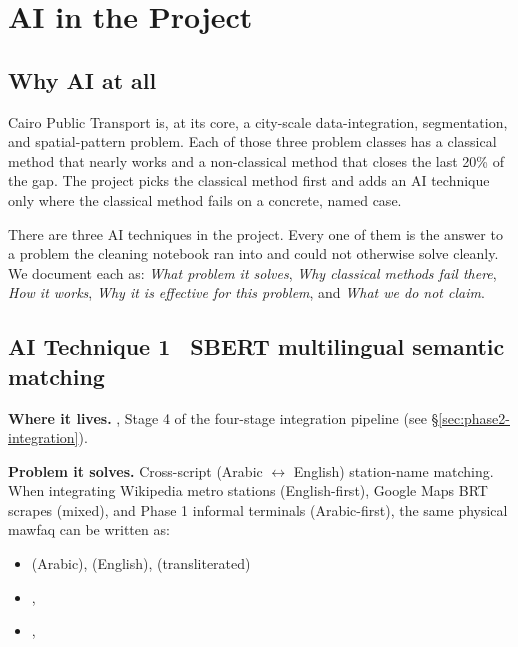 
\section{AI in the Project}
\label{sec:ai}

\subsection{Why AI at all}

Cairo Public Transport is, at its core, a city-scale data-integration,
segmentation, and spatial-pattern problem. Each of those three problem
classes has a classical method that nearly works and a non-classical
method that closes the last 20\% of the gap. The project picks the
classical method first and adds an AI technique only where the
classical method fails on a concrete, named case.

There are three AI techniques in the project. Every one of them is the
answer to a problem the cleaning notebook ran into and could not
otherwise solve cleanly. We document each as: \emph{What problem it
solves}, \emph{Why classical methods fail there}, \emph{How it works},
\emph{Why it is effective for this problem}, and \emph{What we do not
claim}.

\subsection{AI Technique 1 \textbullet\ SBERT multilingual semantic matching}

\textbf{Where it lives.} 
, Stage 4 of the four-stage integration pipeline (see
\S\ref{sec:phase2-integration}).

\textbf{Problem it solves.} Cross-script (Arabic $\leftrightarrow$ English)
station-name matching. When integrating Wikipedia metro stations
(English-first), Google Maps BRT scrapes (mixed), and Phase 1
informal terminals (Arabic-first), the same physical mawfaq can be
written as:

\begin{itemize}
 \item {} (Arabic),  (English),  (transliterated)
 \item {}, 
 \item {}, 
\end{itemize}


